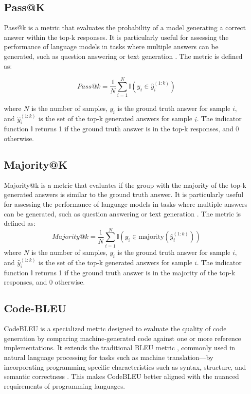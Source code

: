\subsection{Pass@K}

Pass@k is a metric that evaluates the probability of a model generating a correct answer within the top-k responses. It is particularly useful for assessing the performance of language models in tasks where multiple answers can be generated, such as question answering or text generation \cite{Levi2024SimpleModelInferenceScalingLaws}. The metric is defined as:

\begin{equation}
    Pass@k = \frac{1}{N} \sum_{i=1}^{N} \mathbb{I}(y_i \in \hat{y}_i^{(1:k)})
\end{equation}

where \(N\) is the number of samples, \(y_i\) is the ground truth answer for sample \(i\), and \(\hat{y}_i^{(1:k)}\) is the set of the top-k generated answers for sample \(i\). The indicator function \(\mathbb{I}\) returns 1 if the ground truth answer is in the top-k responses, and 0 otherwise.

\subsection{Majority@K}

Majority@k is a metric that evaluates if the group with the majority of the top-k generated answers is similar to the ground truth answer. It is particularly useful for assessing the performance of language models in tasks where multiple answers can be generated, such as question answering or text generation \cite{Wang2023SelfConsistency}. The metric is defined as:
\begin{equation}
    Majority@k = \frac{1}{N} \sum_{i=1}^{N} \mathbb{I}(y_i \in \text{majority}(\hat{y}_i^{(1:k)}))
\end{equation}
where \(N\) is the number of samples, \(y_i\) is the ground truth answer for sample \(i\), and \(\hat{y}_i^{(1:k)}\) is the set of the top-k generated answers for sample \(i\). The indicator function \(\mathbb{I}\) returns 1 if the ground truth answer is in the majority of the top-k responses, and 0 otherwise.


\subsection{Code-BLEU}

CodeBLEU is a specialized metric designed to evaluate the quality of code generation by comparing machine-generated code against one or more reference implementations. It extends the traditional BLEU metric \cite{Papineni2002BLEU}, commonly used in natural language processing for tasks such as machine translation—by incorporating programming-specific characteristics such as syntax, structure, and semantic correctness \cite{Ren2020CodeBLEU}. This makes CodeBLEU better aligned with the nuanced requirements of programming languages.

